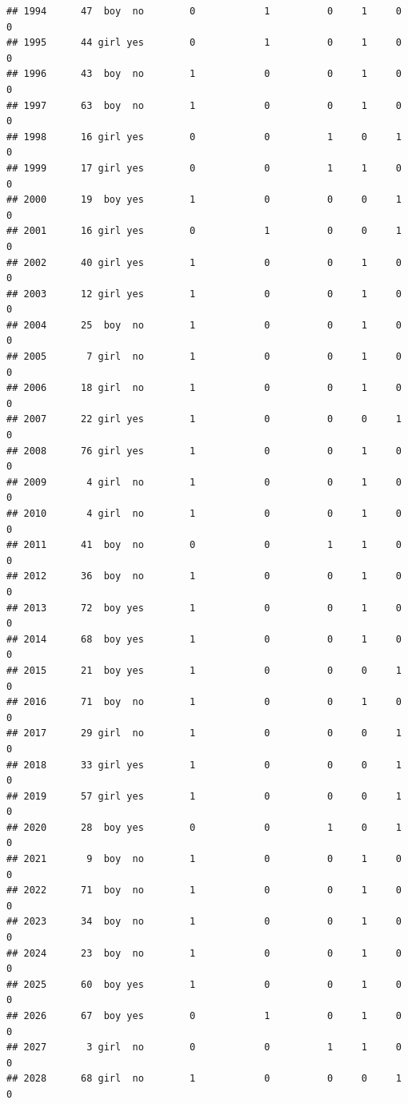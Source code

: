\documentclass[man]{apa6}
\begin{document}
\begin{verbatim}
## 1994      47  boy  no        0            1          0     1     0     0
## 1995      44 girl yes        0            1          0     1     0     0
## 1996      43  boy  no        1            0          0     1     0     0
## 1997      63  boy  no        1            0          0     1     0     0
## 1998      16 girl yes        0            0          1     0     1     0
## 1999      17 girl yes        0            0          1     1     0     0
## 2000      19  boy yes        1            0          0     0     1     0
## 2001      16 girl yes        0            1          0     0     1     0
## 2002      40 girl yes        1            0          0     1     0     0
## 2003      12 girl yes        1            0          0     1     0     0
## 2004      25  boy  no        1            0          0     1     0     0
## 2005       7 girl  no        1            0          0     1     0     0
## 2006      18 girl  no        1            0          0     1     0     0
## 2007      22 girl yes        1            0          0     0     1     0
## 2008      76 girl yes        1            0          0     1     0     0
## 2009       4 girl  no        1            0          0     1     0     0
## 2010       4 girl  no        1            0          0     1     0     0
## 2011      41  boy  no        0            0          1     1     0     0
## 2012      36  boy  no        1            0          0     1     0     0
## 2013      72  boy yes        1            0          0     1     0     0
## 2014      68  boy yes        1            0          0     1     0     0
## 2015      21  boy yes        1            0          0     0     1     0
## 2016      71  boy  no        1            0          0     1     0     0
## 2017      29 girl  no        1            0          0     0     1     0
## 2018      33 girl yes        1            0          0     0     1     0
## 2019      57 girl yes        1            0          0     0     1     0
## 2020      28  boy yes        0            0          1     0     1     0
## 2021       9  boy  no        1            0          0     1     0     0
## 2022      71  boy  no        1            0          0     1     0     0
## 2023      34  boy  no        1            0          0     1     0     0
## 2024      23  boy  no        1            0          0     1     0     0
## 2025      60  boy yes        1            0          0     1     0     0
## 2026      67  boy yes        0            1          0     1     0     0
## 2027       3 girl  no        0            0          1     1     0     0
## 2028      68 girl  no        1            0          0     0     1     0

\end{verbatim}
\end{document}
